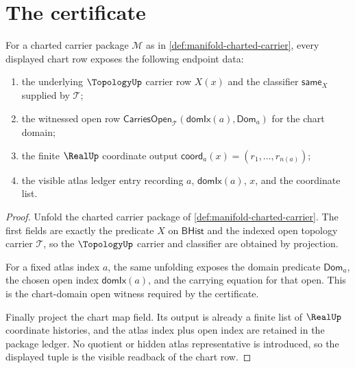 \section{The certificate}
\label{sec:manifold-certificate}

\begin{theorem}
\label{thm:manifold-chart-endpoint-coverage}
For a charted carrier package $\mathcal{M}$ as in
\autoref{def:manifold-charted-carrier}, every displayed chart row exposes the
following endpoint data:
\begin{enumerate}
\item the underlying $\TopologyUp$ carrier row $X(x)$ and the classifier
$\mathsf{same}_X$ supplied by $\mathcal{T}$;
\item the witnessed open row
$\mathsf{CarriesOpen}_{\mathcal{T}}(\mathsf{domIx}(a),\mathsf{Dom}_a)$ for the
chart domain;
\item the finite $\RealUp$ coordinate output
$\mathsf{coord}_a(x)=(r_1,\ldots,r_{n(a)})$;
\item the visible atlas ledger entry recording $a$, $\mathsf{domIx}(a)$,
$x$, and the coordinate list.
\end{enumerate}
\end{theorem}
\begin{proof}
Unfold the charted carrier package of
\autoref{def:manifold-charted-carrier}. The first fields are exactly the
predicate $X$ on $\mathsf{BHist}$ and the indexed open topology carrier
$\mathcal{T}$, so the $\TopologyUp$ carrier and classifier are obtained by
projection.

For a fixed atlas index $a$, the same unfolding exposes the domain predicate
$\mathsf{Dom}_a$, the chosen open index $\mathsf{domIx}(a)$, and the carrying
equation for that open. This is the chart-domain open witness required by the
certificate.

Finally project the chart map field. Its output is already a finite list of
$\RealUp$ coordinate histories, and the atlas index plus open index are
retained in the package ledger. No quotient or hidden atlas representative is
introduced, so the displayed tuple is the visible readback of the chart row.
\end{proof}

